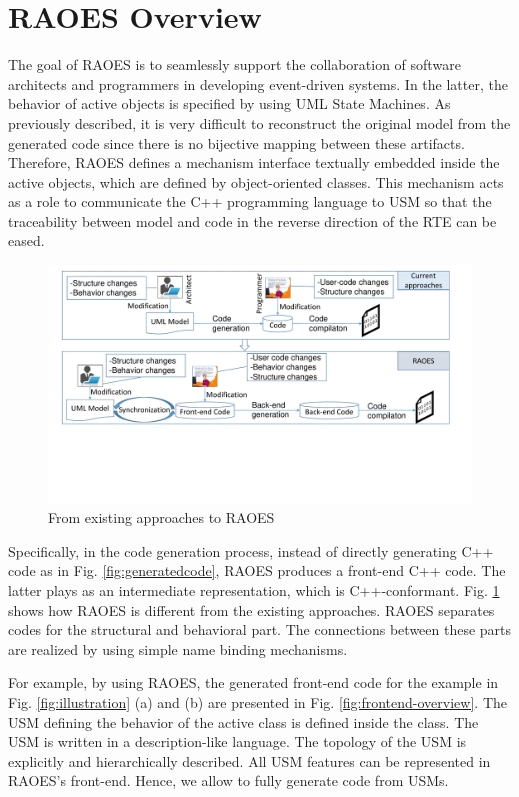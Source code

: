 \section{RAOES Overview}
\label{sec:overview}
The goal of RAOES is to seamlessly support the collaboration of software architects and programmers in developing event-driven systems.
In the latter, the behavior of active objects is specified by using UML State Machines.
As previously described, it is very difficult to reconstruct the original model from the generated code since there is no bijective mapping between these artifacts.
Therefore, RAOES defines a mechanism interface textually embedded inside the active objects, which are defined by object-oriented classes. 
This mechanism acts as a role to communicate the C++ programming language to USM so that the traceability between model and code in the reverse direction of the RTE can be eased.

\begin{figure}
	\centering
	\includegraphics[clip, trim=0.6cm 6.4cm 1.4cm 0.5cm, width=1.0\columnwidth]{figures/frontend}
	\caption{From existing approaches to RAOES} 
	\label{fig:raoes}
\end{figure}

Specifically, in the code generation process, instead of directly generating C++ code as in Fig. \ref{fig:generatedcode}, RAOES produces a front-end C++ code.
The latter plays as an intermediate representation, which is C++-conformant.
Fig. \ref{fig:raoes} shows how RAOES is different from the existing approaches.
RAOES separates codes for the structural and behavioral part.
The connections between these parts are realized by using simple name binding mechanisms.

For example, by using RAOES, the generated front-end code for the example in Fig. \ref{fig:illustration} (a) and (b) are presented in Fig. \ref{fig:frontend-overview}.
The USM defining the behavior of the active class  is defined inside the class.
The USM is written in a description-like language.
The topology of the USM is explicitly and hierarchically described.
All USM features can be represented in RAOES's front-end.
Hence, we allow to fully generate code from USMs.

